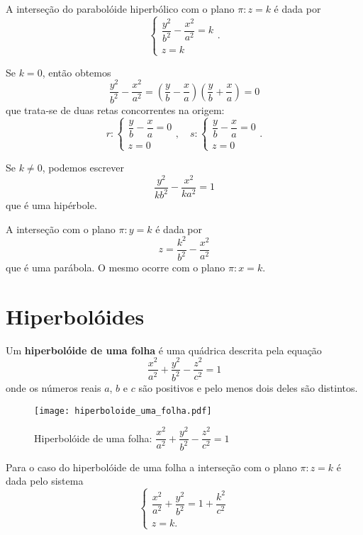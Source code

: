 A interse\c{c}\~ao do parabol\'oide hiperb\'olico com o plano $\pi : z = k$ \'e dada por
\[
	\begin{cases}
		\dfrac{y^2}{b^2} - \dfrac{x^2}{a^2} = k\\
		z = k
	\end{cases}.
\]

Se $k = 0$, ent\~ao obtemos
\[
	\dfrac{y^2}{b^2} - \dfrac{x^2}{a^2} = \left(\dfrac{y}{b} - \dfrac{x}{a}\right)\left(\dfrac{y}{b} + \dfrac{x}{a}\right) = 0
\]
que trata-se de duas retas concorrentes na origem:
\[
	r : \begin{cases}
		\dfrac{y}{b} - \dfrac{x}{a} = 0\\
		z = 0
	\end{cases}, \quad s : \begin{cases}
		\dfrac{y}{b} - \dfrac{x}{a} = 0\\
		z = 0
	\end{cases}.
\]

Se $k \ne 0$, podemos escrever
\[
	\dfrac{y^2}{kb^2} - \dfrac{x^2}{ka^2} = 1
\]
que \'e uma hip\'erbole.

A interse\c{c}\~ao com o plano $\pi : y = k$ \'e dada por
\[
	z = \dfrac{k^2}{b^2} - \dfrac{x^2}{a^2}
\]
que \'e uma par\'abola. O mesmo ocorre com o plano $\pi : x = k$.


\section{Hiperbol\'oides} %
\label{sec:hiperboloide}
\begin{definicao}
	Um \textbf{hiperbol\'oide de uma folha} \'e uma qu\'adrica descrita pela equa\c{c}\~ao
	\[
		\dfrac{x^2}{a^2} + \dfrac{y^2}{b^2} - \dfrac{z^2}{c^2} = 1
	\]
	onde os n\'umeros reais $a$, $b$ e $c$ s\~ao positivos e pelo menos dois deles s\~ao distintos.
\end{definicao}

\begin{figure}[!h]
	\centering
	\caption{Hiperbol\'oide de uma folha: $\dfrac{x^2}{a^2} + \dfrac{y^2}{b^2} - \dfrac{z^2}{c^2} = 1$}
	\texttt{[image: hiperboloide\_uma\_folha.pdf]}
\end{figure}

Para o caso do hiperbol\'oide de uma folha a interse\c{c}\~ao com o plano $\pi : z = k$ \'e dada pelo sistema
\[
	\begin{cases}
		\dfrac{x^2}{a^2} + \dfrac{y^2}{b^2} = 1 + \dfrac{k^2}{c^2}\\
		z = k.
	\end{cases}
\]

